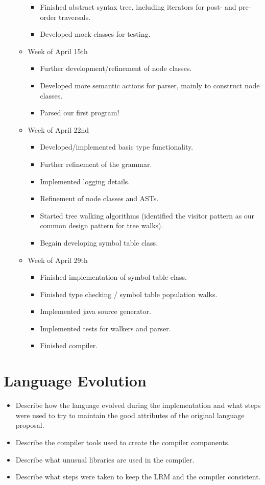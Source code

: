 \documentclass{report}
\begin{document}
\begin{itemize}
\begin{itemize}
\begin{itemize}
\item Finished abstract syntax tree, including iterators for post- and pre-order 
traversals.
\item Developed mock classes for testing.
\end{itemize}
\item[] Week of April 15th
\begin{itemize}
\item Further development/refinement of node classes.
\item Developed more semantic actions for parser, mainly to construct node classes.
\item Parsed our first program! 
\end{itemize}
\item[] Week of April 22nd
\begin{itemize}
\item Developed/implemented basic type functionality.
\item Further refinement of the grammar.
\item Implemented logging details. 
\item Refinement of node classes and ASTs.
\item Started tree walking algorithms (identified the visitor pattern as our
common design pattern for tree walks).
\item Begain developing symbol table class.
\end{itemize}
\item[] Week of April 29th
\begin{itemize}
\item Finished implementation of symbol table class.
\item Finished type checking / symbol table population walks.
\item Implemented java source generator.
\item Implemented tests for walkers and parser. 
\item Finished compiler.
\end{itemize}
\end{itemize} %
\end{itemize} %


\chapter{Language Evolution}
\label{chap:evo}

\begin{itemize}
\item Describe how the language evolved during the implementation and what steps were used to try to maintain the good attributes of the original language proposal.
\item Describe the compiler tools used to create the compiler components.
\item Describe what unusual libraries are used in the compiler.
\item Describe what steps were taken to keep the LRM and the compiler consistent.
\end{itemize}
\end{document}
